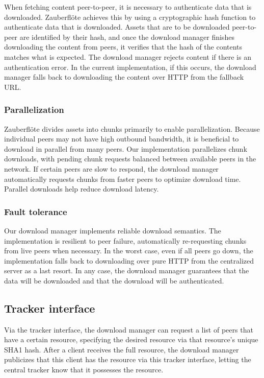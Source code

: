 \documentclass[letterpaper,twocolumn,10pt]{article}
\newcommand{\zbf}{Zauberfl\"{o}te\xspace}
\begin{document}
When fetching content peer-to-peer, it is necessary to authenticate data that
is downloaded. \zbf achieves this by using a cryptographic hash function to
authenticate data that is downloaded. Assets that are to be downloaded
peer-to-peer are identified by their hash, and once the download manager
finishes downloading the content from peers, it verifies that the hash of the
contents matches what is expected. The download manager rejects content if
there is an authentication error. In the current implementation, if this
occurs, the download manager falls back to downloading the content over HTTP
from the fallback URL.

\subsubsection{Parallelization}

\zbf divides assets into chunks primarily to enable parallelization. Because
individual peers may not have high outbound bandwidth, it is beneficial to
download in parallel from many peers. Our implementation parallelizes chunk
downloads, with pending chunk requests balanced between available peers in the
network. If certain peers are slow to respond, the download manager
automatically requests chunks from faster peers to optimize download time.
Parallel downloads help reduce download latency.

\subsubsection{Fault tolerance}

Our download manager implements reliable download semantics. The implementation
is resilient to peer failure, automatically re-requesting chunks from live
peers when necessary. In the worst case, even if all peers go down, the
implementation falls back to downloading over pure HTTP from the centralized
server as a last resort. In any case, the download manager guarantees that the
data will be downloaded and that the download will be authenticated.

\subsection{Tracker interface}

Via the tracker interface, the download manager can request a list of peers that
have a certain resource, specifying the desired resource via that resource's
unique SHA1 hash. After a client receives the full resource, the download
manager publicizes that this client has the resource via this tracker interface,
letting the central tracker know that it possesses the resource.
\end{document}
